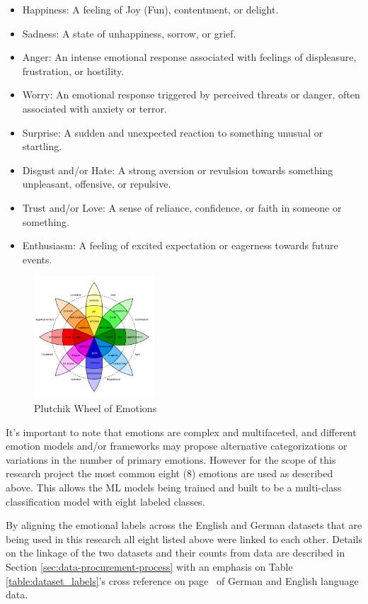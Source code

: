 \documentclass[11pt]{article}
\begin{document}
\begin{itemize}
\item Happiness: A feeling of Joy (Fun), contentment, or delight.
\item Sadness: A state of unhappiness, sorrow, or grief.
\item Anger: An intense emotional response associated with feelings of displeasure, frustration, or hostility.
\item Worry: An emotional response triggered by perceived threats or danger, often associated with anxiety or terror.
\item Surprise: A sudden and unexpected reaction to something unusual or startling.
\item Disgust and/or Hate: A strong aversion or revulsion towards something unpleasant, offensive, or repulsive.
\item Trust and/or Love: A sense of reliance, confidence, or faith in someone or something.
\item Enthusiasm: A feeling of excited expectation or eagerness towards future events.
\end{itemize}

\begin{figure}[h]
    \centering
    \includegraphics[width=0.4\textwidth]{Plutchik-Wheel}
    \caption{Plutchik Wheel of Emotions}
    \label{fig:plutchik-wheel}
\end{figure}

It's important to note that emotions are complex and multifaceted, and different emotion models and/or frameworks may propose alternative categorizations or variations in the number of primary emotions. However for the scope of this research project the most common eight (8) emotions are used as described above. This allows the ML models being trained and built to be a multi-class classification model with eight labeled classes.

By aligning the emotional labels across the English \cite{english-dataset-twitter} and German \cite{german-dataset-cheese} datasets that are being used in this research all eight listed above were linked to each other. Details on the linkage of the two datasets and their counts from data are described in Section \ref{sec:data-procurement-process} with an emphasis on Table \ref{table:dataset_labels}'s cross reference on page~\pageref{table:dataset_labels} of German and English language data.
\end{document}
